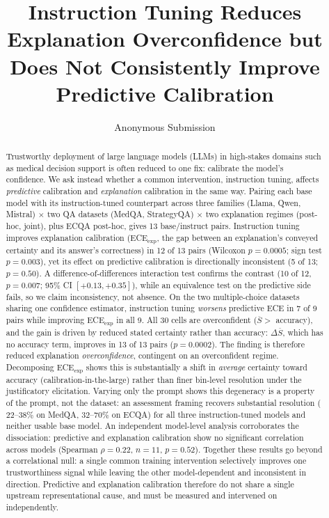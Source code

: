 \documentclass[letterpaper]{article} %
\title{Instruction Tuning Reduces Explanation Overconfidence but Does
Not Consistently Improve Predictive Calibration}
\author{Anonymous Submission}
\begin{document}
\maketitle

\begin{abstract} Trustworthy deployment of large language models (LLMs) in high-stakes domains such as medical decision support is often reduced to one fix: calibrate the model's confidence. We ask instead whether a common intervention, instruction tuning, affects \emph{predictive} calibration and \emph{explanation} calibration in the same way. Pairing each base model with its instruction-tuned counterpart across three families (Llama, Qwen, Mistral) $\times$ two QA datasets (MedQA, StrategyQA) $\times$ two explanation regimes (post-hoc, joint), plus ECQA post-hoc, gives 13 base/instruct pairs. Instruction tuning improves explanation calibration (ECE$_{\text{exp}}$, the gap between an explanation's conveyed certainty and its answer's correctness) in 12 of 13 pairs (Wilcoxon $p{=}0.0005$; sign test $p{=}0.003$), yet its effect on predictive calibration is directionally inconsistent (5 of 13; $p{=}0.50$). A difference-of-differences interaction test confirms the contrast (10 of 12, $p{=}0.007$; 95\% CI $[+0.13,+0.35]$), while an equivalence test on the predictive side fails, so we claim inconsistency, not absence. On the two multiple-choice datasets sharing one confidence estimator, instruction tuning \emph{worsens} predictive ECE in 7 of 9 pairs while improving ECE$_{\text{exp}}$ in all 9. All 30 cells are overconfident ($\overline{S} > $ accuracy), and the gain is driven by reduced stated certainty rather than accuracy: $\Delta\overline{S}$, which has no accuracy term, improves in 13 of 13 pairs ($p{=}0.0002$). The finding is therefore reduced explanation \emph{overconfidence}, contingent on an overconfident regime. Decomposing ECE$_{\text{exp}}$ shows this is substantially a shift in \emph{average} certainty toward accuracy (calibration-in-the-large) rather than finer bin-level resolution under the justificatory elicitation. Varying only the prompt shows this degeneracy is a property of the prompt, not the dataset: an assessment framing recovers substantial resolution ($22$--$38\%$ on MedQA, $32$--$70\%$ on ECQA) for all three instruction-tuned models and neither usable base model. An independent model-level analysis corroborates the dissociation: predictive and explanation calibration show no significant correlation across models (Spearman $\rho{=}0.22$, $n{=}11$, $p{=}0.52$). Together these results go beyond a correlational null: a single common training intervention selectively improves one trustworthiness signal while leaving the other model-dependent and inconsistent in direction. Predictive and explanation calibration therefore do not share a single upstream representational cause, and must be measured and intervened on independently. \end{abstract}
\end{document}
